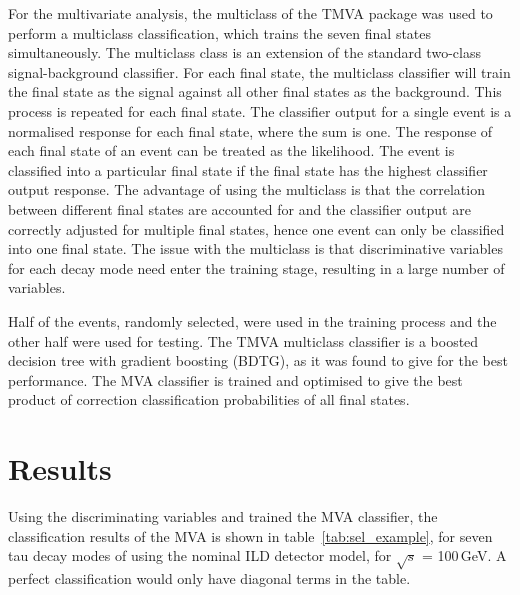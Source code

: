 \documentclass[a4paper,11pt]{article}
\newcommand{\rootS}{\ensuremath{\sqrt{s}} }
\begin{document}
For the multivariate analysis, the multiclass of the TMVA package \cite{Therhaag:2009dp} was used to perform a multiclass classification, which trains the seven final states simultaneously. The multiclass class is an extension of the standard two-class signal-background classifier. For each final state, the multiclass classifier will train the final state as the signal against all other final states as the background. This process is repeated for each final state. The classifier output for a single event is a normalised response for each final state, where the sum is one. The response of each final state of an event can be treated as the likelihood. The event is classified into a particular final state if the final state has the highest classifier output response. The advantage of using the multiclass is that the correlation between different final states are accounted for and the classifier output are correctly adjusted for multiple final states, hence one event can only be classified into one final state. The issue with the multiclass is that discriminative variables for each decay mode need enter the training stage, resulting in a large number of variables. 

Half of the events, randomly selected, were used in the training process and the other half were used for testing. The TMVA multiclass classifier is a boosted decision tree with gradient boosting (BDTG), as it was found to give for the best performance.  The MVA classifier is trained and optimised to give the best product of correction classification probabilities of all final states.

\section{Results}

Using the discriminating variables and trained the MVA classifier, the classification results of the MVA is shown in table~\ref{tab:sel_example}, for seven tau decay modes of  using  the nominal ILD detector model, for \rootS = 100\,GeV. A perfect classification would only have diagonal terms in the table. 

\end{document}
